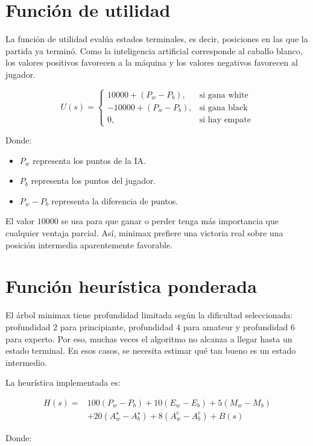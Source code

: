 \documentclass[12pt,letterpaper]{article}
\begin{document}
\section{Función de utilidad}

La función de utilidad evalúa estados terminales, es decir, posiciones en las que la partida ya terminó. Como la inteligencia artificial corresponde al caballo blanco, los valores positivos favorecen a la máquina y los valores negativos favorecen al jugador.

\[
U(s)=
\begin{cases}
10000 + (P_w - P_b), & \text{si gana white}\\
-10000 + (P_w - P_b), & \text{si gana black}\\
0, & \text{si hay empate}
\end{cases}
\]

\noindent Donde:

\begin{itemize}
    \item $P_w$ representa los puntos de la IA.
    \item $P_b$ representa los puntos del jugador.
    \item $P_w - P_b$ representa la diferencia de puntos.
\end{itemize}

El valor $10000$ se usa para que ganar o perder tenga más importancia que cualquier ventaja parcial. Así, minimax prefiere una victoria real sobre una posición intermedia aparentemente favorable.

\section{Función heurística ponderada}

El árbol minimax tiene profundidad limitada según la dificultad seleccionada: profundidad 2 para principiante, profundidad 4 para amateur y profundidad 6 para experto. Por eso, muchas veces el algoritmo no alcanza a llegar hasta un estado terminal. En esos casos, se necesita estimar qué tan bueno es un estado intermedio.

La heurística implementada es:

\[
\begin{aligned}
H(s)=
&100(P_w-P_b)
+10(E_w-E_b)
+5(M_w-M_b)\\
&+20(A^\star_w-A^\star_b)
+8(A^e_w-A^e_b)
+B(s)
\end{aligned}
\]

\noindent Donde:
\end{document}
